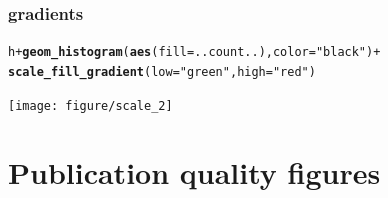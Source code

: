 \documentclass{beamer}\usepackage{graphicx, color}
\makeatletter
\newcommand{\hlfunctioncall}[1]{\textcolor[rgb]{0.501960784313725,0,0.329411764705882}{\textbf{#1}}}%
\newcommand{\hlstring}[1]{\textcolor[rgb]{0.6,0.6,1}{#1}}%
\newenvironment{kframe}{%
 \def\at@end@of@kframe{}%
 \ifinner\ifhmode%
  \def\at@end@of@kframe{\end{minipage}}%
  \begin{minipage}{\columnwidth}%
 \fi\fi%
 \def\FrameCommand##1{\hskip\@totalleftmargin \hskip-\fboxsep
 \colorbox{shadecolor}{##1}\hskip-\fboxsep
     \hskip-\linewidth \hskip-\@totalleftmargin \hskip\columnwidth}%
 \MakeFramed {\advance\hsize-\width
   \@totalleftmargin\z@ \linewidth\hsize
   \@setminipage}}%
 {\par\unskip\endMakeFramed%
 \at@end@of@kframe}
\newenvironment{knitrout}{}{} %
\makeatother
\begin{document}
\begin{frame}[fragile]
\frametitle{gradients}
\begin{knitrout}\footnotesize
{}\color{fgcolor}\begin{kframe}
\begin{alltt}
h + \hlfunctioncall{geom_histogram}( \hlfunctioncall{aes}(fill = ..count..), color=\hlstring{"black"}) +
\hlfunctioncall{scale_fill_gradient}(low=\hlstring{"green"}, high=\hlstring{"red"})
\end{alltt}
\end{kframe}
\texttt{[image: figure/scale\_2]} 

\end{knitrout}

\end{frame}



\section*{Publication quality figures}
\frame{\sectionpage}
\end{document}
